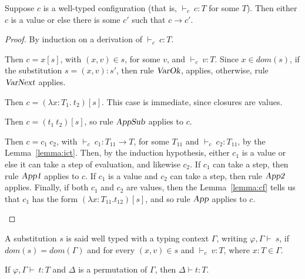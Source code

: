 \documentclass[preprint,authoryear,sort&compress,9pt,nocopyrightspace]{article}
\newcommand{\tto}{\longrightarrow}
\newcommand{\conf}[2][s]{(#2)[#1]}
\newcommand{\Subx}{(x,v):s'}
\newcommand{\env}{{\emt,\Gamma \vdash \ }}
\newcommand{\tyC}{{\vdash_c \ }}
\newcommand{\absD}{\lambda x:T_1. \ t_2}
\newcommand{\emt}{\varphi}
\begin{document}
\begin{theorem}[Progress]
\label{theorem:progress}
\mbox{}
Suppose $c$ is a well-typed configuration (that is, $ \tyC c : T$ for some $T$). Then either $c$ is a value or else there is some $c'$ such that $c \tto c'$.
\end{theorem}

\begin{proof} By induction on a derivation of $\tyC c : T$.
\begin{case}[TCVar]
Then $c = x[s]$, with $(x,v) \in s$, for some $v$,  and $\tyC v:T$. Since $x \in dom(s)$, if the substitution $s = \Subx$, then rule $\textsl {VarOk}$, applies, otherwise, rule $\textsl {VarNext}$ applies.
\end{case}

\begin{case}[TCAbs]
 Then $c = \conf{\absD}$. This case is immediate, since closures are values.
\end{case}

\begin{case}[TCApp] 
 Then $c = \conf{t_1 \ t_2}$, so rule $\textsl {AppSub}$ applies to $c$.
\end{case}

\begin{case}[TCCApp]
 Then $c = c_1 \ c_2$, with $\tyC c_1 : T_{11} \to T$, for some $T_{11}$ and $\tyC c_2 : T_{11}$, by the Lemma~\ref{lemma:ict}. Then, by the induction hypothesis, either $c_1$ is a value or else it can take a step of evaluation, and likewise $c_2$. If $c_1$ can take a step, then rule $\textsl {App1}$ applies to $c$. If $c_1$ is a value and $c_2$ can take a step, then rule $\textsl {App2}$ applies. Finally, if both $c_1$ and $c_2$ are values, then the Lemma~\ref{lemma:cf} tells us that $c_1$ has the form $\conf{\lambda x: T_{11}.t_{12}}$, and so rule $\textsl {App}$ applies to $c$.
\end{case}
\end{proof}

\begin{definition}
\label{definition:wts}
\mbox{}
A substitution $s$ is said well typed with a typing context $\Gamma$, writing $\env s$, if $dom(s) = dom(\Gamma)$ and for every $(x,v) \in s$ and $\tyC v:T$, where $x:T \in \Gamma$.
\end{definition}

\begin{lemma}[Permutation]
\label{lemma:permutation}
\mbox{}
If $\env t : T$ and $\Delta$ is a permutation of $\Gamma$, then $\Delta \vdash t : T$.
\end{lemma}
\end{document}
